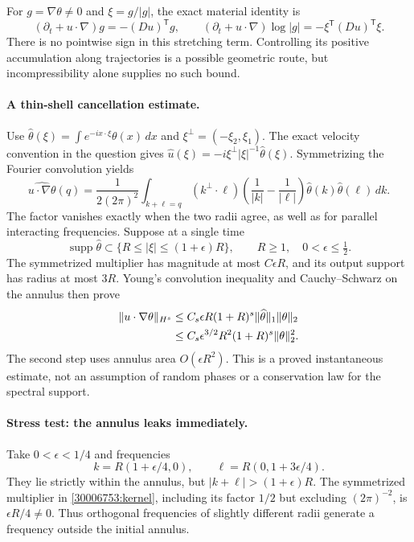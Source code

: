 \documentclass[11pt,a4paper]{article}
\numberwithin{equation}{section}
\begin{document}
For $g=\nabla\theta\ne0$ and $\xi=g/|g|$, the exact material identity is
\[
 (\partial_t+u\cdot\nabla)g=-(Du)^{\mathsf T}g,\qquad
 (\partial_t+u\cdot\nabla)\log|g|
       =-\xi^{\mathsf T}(Du)^{\mathsf T}\xi.
\]
There is no pointwise sign in this stretching term. Controlling its
positive accumulation along trajectories is a possible geometric route,
but incompressibility alone supplies no such bound.

\paragraph{A thin-shell cancellation estimate.}
Use $\widehat\theta(\xi)=\int e^{-ix\cdot\xi}\theta(x)\,dx$ and
$\xi^\perp=(-\xi_2,\xi_1)$. The exact velocity convention in the question
gives $\widehat u(\xi)=-i\xi^\perp|\xi|^{-1}\widehat\theta(\xi)$.
Symmetrizing the Fourier convolution yields
\begin{equation}\label{30006753:kernel}
 \widehat{u\cdot\nabla\theta}(q)
 =\frac{1}{2(2\pi)^2}\int_{k+\ell=q}
 (k^\perp\cdot\ell)
 \left(\frac1{|k|}-\frac1{|\ell|}\right)
 \widehat\theta(k)\widehat\theta(\ell)\,dk.
\end{equation}
The factor vanishes exactly when the two radii agree, as well as for
parallel interacting frequencies. Suppose at a single time
\[
 \operatorname{supp}\widehat\theta\subset
 \{R\le|\xi|\le(1+\epsilon)R\},
 \qquad R\ge1,\quad0<\epsilon\le\tfrac12.
\]
The symmetrized multiplier has magnitude at most $C\epsilon R$, and its
output support has radius at most $3R$. Young's convolution inequality and
Cauchy--Schwarz on the annulus then prove
\begin{align}
 \|u\cdot\nabla\theta\|_{H^s}
 &\le C_s\epsilon R(1+R)^s
                   \|\widehat\theta\|_1\|\theta\|_2\notag\\
 &\le C_s\epsilon^{3/2}R^2(1+R)^s\|\theta\|_2^2.
 \label{30006753:shell}
\end{align}
The second step uses annulus area $O(\epsilon R^2)$. This is a proved
instantaneous estimate, not an assumption of random phases or a
conservation law for the spectral support.

\paragraph{Stress test: the annulus leaks immediately.}
Take $0<\epsilon<1/4$ and frequencies
\[
 k=R(1+\epsilon/4,0),\qquad
 \ell=R(0,1+3\epsilon/4).
\]
They lie strictly within the annulus, but $|k+\ell|>(1+\epsilon)R$.
The symmetrized multiplier in \eqref{30006753:kernel}, including its factor
$1/2$ but excluding $(2\pi)^{-2}$, is $\epsilon R/4\ne0$.
Thus orthogonal frequencies of slightly different radii generate a frequency
outside the initial annulus.
\end{document}
